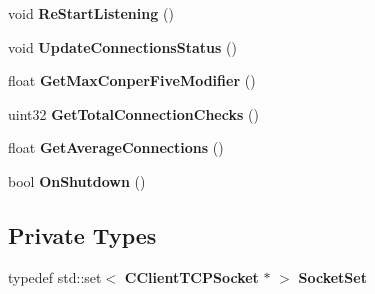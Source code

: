\begin{DoxyCompactItemize}
\item 
void {\bfseries ReStartListening} ()\label{classCListenSocket_add37d182638d4b57579c8e6736099c7d}

\item 
void {\bfseries UpdateConnectionsStatus} ()\label{classCListenSocket_a88e0ac5566c6ade9622434d272d4bf49}

\item 
float {\bfseries GetMaxConperFiveModifier} ()\label{classCListenSocket_a8a26ef69fe0c18358cc39b53f4d8f335}

\item 
uint32 {\bfseries GetTotalConnectionChecks} ()\label{classCListenSocket_a8b47c4c1868191529ad31904f33a6198}

\item 
float {\bfseries GetAverageConnections} ()\label{classCListenSocket_a6d0ca4852eafe5be924acfd4aa57695a}

\item 
bool {\bfseries OnShutdown} ()\label{classCListenSocket_ae43c78d2680696af61f283fd186a36bd}

\end{DoxyCompactItemize}
\subsection*{Private Types}
\begin{DoxyCompactItemize}
\item 
typedef std::set$<$ {\bf CClientTCPSocket} $\ast$ $>$ {\bfseries SocketSet}\label{classCListenSocket_abfb21e84e95296234141d3a50d36a351}

\end{DoxyCompactItemize}
